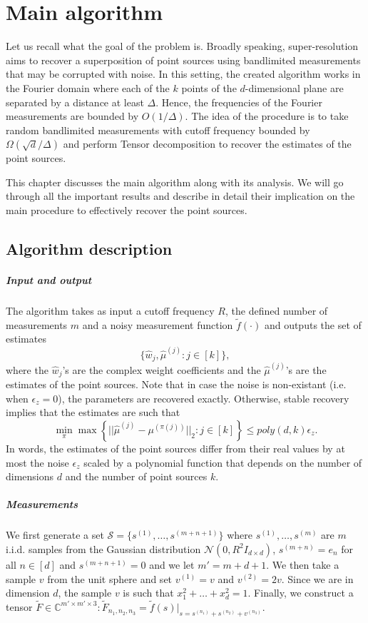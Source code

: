 \chapter{Main algorithm}
Let us recall what the goal of the problem is. Broadly speaking, super-resolution aims to recover a superposition of point sources using bandlimited measurements that may be corrupted with noise. In this setting, the created algorithm works in the Fourier domain where each of the $k$ points of the $d$-dimensional plane are separated by a distance at least $\Delta$. Hence, the frequencies of the Fourier measurements are bounded by $O(1/\Delta)$. The idea of the procedure is to take random bandlimited measurements with cutoff frequency bounded by $\Omega(\sqrt{d}/\Delta)$ and perform Tensor decomposition to recover the estimates of the point sources.\par 
This chapter discusses the main algorithm along with its analysis. We will go through all the important results and describe in detail their implication on the main procedure to effectively recover the point sources.
\section{Algorithm description}
\paragraph{Input and output} The algorithm takes as input a cutoff frequency $R$, the defined number of measurements $m$ and a noisy measurement function $\tilde{f}(\cdot)$ and outputs the set of estimates $$\{\widehat{w}_j,\widehat{\mu}^{(j)}:j\in[k]\},$$ where the $\widehat{w}_j$'s are the complex weight coefficients and the $\widehat{\mu}^{(j)}$'s are the estimates of the point sources. Note that in case the noise is non-existant (i.e. when $\epsilon_z=0$), the parameters are recovered exactly. Otherwise, stable recovery implies that the estimates are such that $$\min_\pi\max\left\{||\widehat{\mu}^{(j)}-\mu^{(\pi(j))}||_2:j\in[k]\right\}\leq poly(d,k)\epsilon_z.$$ In words, the estimates of the point sources differ from their real values by at most the noise $\epsilon_z$ scaled by a polynomial function that depends on the number of dimensions $d$ and the number of point sources $k$.
\paragraph{Measurements} We first generate a set $\mathcal{S}=\{s^{(1)},\ldots,s^{(m+n+1)}\}$ where $s^{(1)},\ldots,s^{(m)}$ are $m$ i.i.d. samples from the Gaussian distribution $\mathcal{N}(0,R^2I_{d\times d})$, $s^{(m+n)}=e_n$ for all $n\in[d]$ and $s^{(m+n+1)}=0$ and we let $m'=m+d+1$. We then take a sample $v$ from the unit sphere and set $v^{(1)}=v$ and $v^{(2)}=2v$. Since we are in dimension $d$, the sample $v$ is such that $x_1^2+\ldots+x_d^2=1$. Finally, we construct a tensor $\tilde{F}\in\mathbb{C}^{m'\times m'\times 3}:\tilde{F}_{n_1,n_2,n_3}=\tilde{f}(s)|_{s=s^{(n_1)}+s^{(n_2)}+v^{(n_3)}}$.
